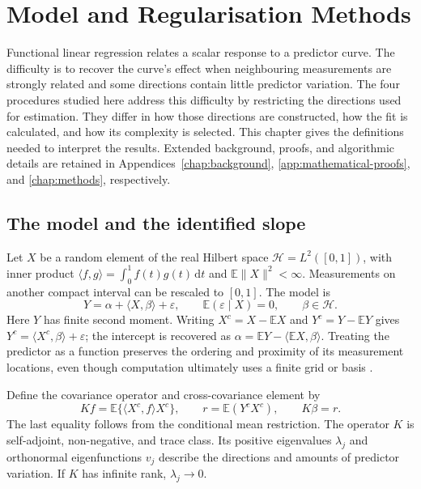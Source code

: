 \chapter{Model and Regularisation Methods}
\label{chap:main-methods}

Functional linear regression relates a scalar response to a predictor curve.
The difficulty is to recover the curve's effect when neighbouring measurements
are strongly related and some directions contain little predictor variation.
The four procedures studied here address this difficulty by restricting the
directions used for estimation. They differ in how those directions are
constructed, how the fit is calculated, and how its complexity is selected.
This chapter gives the definitions needed to interpret the results. Extended
background, proofs, and algorithmic details are retained in
Appendices~\ref{chap:background}, \ref{app:mathematical-proofs}, and
\ref{chap:methods}, respectively.

\section{The model and the identified slope}

Let $X$ be a random element of the real Hilbert space
$\mathcal H=L^2([0,1])$, with inner product
$\langle f,g\rangle=\int_0^1 f(t)g(t)\,\mathrm dt$ and
$\mathbb E\|X\|^2<\infty$. Measurements on another compact interval can be
rescaled to $[0,1]$. The model is
\begin{equation}
 Y=\alpha+\langle X,\beta\rangle+\varepsilon,
 \qquad \mathbb E(\varepsilon\mid X)=0,
 \qquad \beta\in\mathcal H.
 \label{main:eq:model}
\end{equation}
Here $Y$ has finite second moment. Writing $X^c=X-\mathbb EX$ and
$Y^c=Y-\mathbb EY$ gives
$Y^c=\langle X^c,\beta\rangle+\varepsilon$; the intercept is recovered as
$\alpha=\mathbb EY-\langle\mathbb EX,\beta\rangle$. Treating the
predictor as a function preserves the ordering and proximity of its
measurement locations, even though computation ultimately uses a finite
grid or basis \parencite{ramsay_silverman_2005,hsing_eubank_2015}.

Define the covariance operator and cross-covariance element by
\begin{equation}
 Kf=\mathbb E\{\langle X^c,f\rangle X^c\},
 \qquad r=\mathbb E(Y^cX^c),
 \qquad K\beta=r.
 \label{main:eq:normal-equation}
\end{equation}
The last equality follows from the conditional mean restriction. The
operator $K$ is self-adjoint, non-negative, and trace class. Its positive
eigenvalues $\lambda_j$ and orthonormal eigenfunctions $v_j$ describe the
directions and amounts of predictor variation. If $K$ has infinite rank,
$\lambda_j\to0$.

